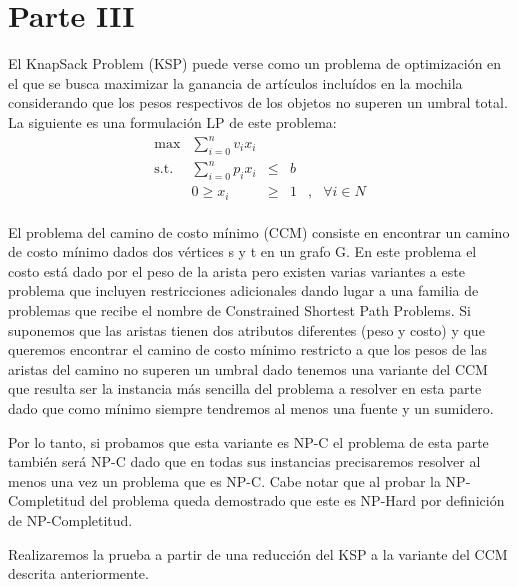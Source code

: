 \documentclass[a4paper,11pt]{article}
\theoremstyle{break}
\begin{document}
\section{Parte III}
El KnapSack Problem (KSP) puede verse como un problema de optimización en el que se busca maximizar la ganancia de artículos incluídos en la mochila considerando que los pesos respectivos de los objetos no superen un umbral total. La siguiente es una formulación LP de este problema:
\begin{equation}
\begin{array}{rrclcl}
\displaystyle \max & \sum_{i=0}^{n} v_ix_i  \\
\textrm{s.t.} & \sum_{i=0}^{n} p_ix_i & \leq & b \\
& 0 \geq x_i & \geq & 1  &, & \forall i \in N \\
\end{array}
\end{equation}

El problema del camino de costo mínimo (CCM) consiste en encontrar un camino de costo mínimo dados dos vértices s y t en un grafo G. En este problema el costo está dado por el peso de la arista pero existen varias variantes a este problema que incluyen restricciones adicionales dando lugar a una familia de problemas que recibe el nombre de Constrained Shortest Path Problems.
Si suponemos que las aristas tienen dos atributos diferentes (peso y costo) y que queremos encontrar el camino de costo mínimo restricto a que los pesos de las aristas del camino no superen un umbral dado tenemos una variante del CCM que resulta ser la instancia más sencilla del problema a resolver en esta parte dado que como mínimo siempre tendremos al menos una fuente y un sumidero.

Por lo tanto, si probamos que esta variante es NP-C el problema de esta parte también será NP-C dado que en todas sus instancias precisaremos resolver al menos una vez un problema que es NP-C.
Cabe notar que al probar la NP-Completitud del problema queda demostrado que este es NP-Hard por definición de NP-Completitud.

Realizaremos la prueba a partir de una reducción del KSP a la variante del CCM descrita anteriormente.
\end{document}
